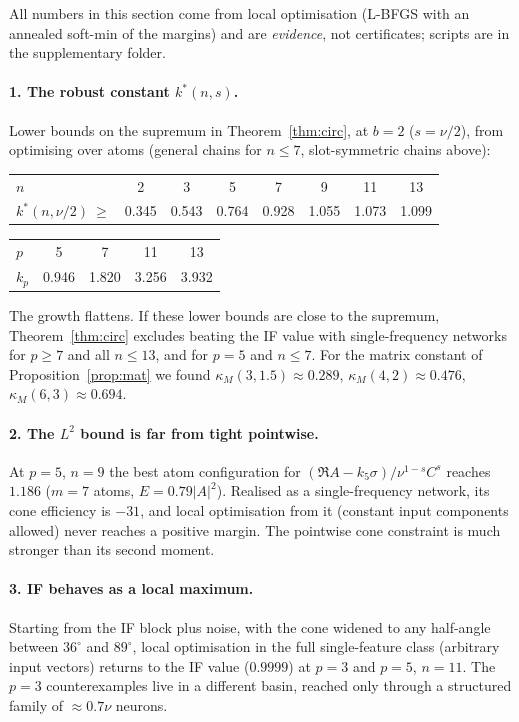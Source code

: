 All numbers in this section come from local optimisation (L-BFGS with an annealed soft-min of the margins) and are
\emph{evidence}, not certificates; scripts are in the supplementary folder.

\paragraph{1. The robust constant $k^*(n,s)$.}  Lower bounds on the supremum in Theorem~\ref{thm:circ}, at $b=2$
($s=\nu/2$), from optimising over atoms (general chains for $n\le7$, slot-symmetric chains above):
\begin{center}
\begin{tabular}{lccccccc}
\toprule
$n$ & 2 & 3 & 5 & 7 & 9 & 11 & 13\\
$k^*(n,\nu/2)\ \ge$ & 0.345 & 0.543 & 0.764 & 0.928 & 1.055 & 1.073 & 1.099\\
\bottomrule
\end{tabular}
\qquad
\begin{tabular}{lcccc}
\toprule
$p$ & 5 & 7 & 11 & 13\\
$k_p$ & 0.946 & 1.820 & 3.256 & 3.932\\
\bottomrule
\end{tabular}
\end{center}
The growth flattens.  If these lower bounds are close to the supremum, Theorem~\ref{thm:circ} excludes beating the IF value
with single-frequency networks for $p\ge7$ and all $n\le13$, and for $p=5$ and $n\le7$.  For the matrix constant of
Proposition~\ref{prop:mat} we found $\kappa_M(3,1.5)\approx0.289$, $\kappa_M(4,2)\approx0.476$, $\kappa_M(6,3)\approx0.694$.

\paragraph{2. The $L^2$ bound is far from tight pointwise.}  At $p=5$, $n=9$ the best atom configuration for
$(\Re A-k_5\sigma)/\nu^{1-s}C^s$ reaches $1.186$ ($m=7$ atoms, $E=0.79|A|^2$).  Realised as a single-frequency network,
its cone efficiency is $-31$, and local optimisation from it (constant input components allowed) never reaches a positive
margin.  The pointwise cone constraint is much stronger than its second moment.

\paragraph{3. IF behaves as a local maximum.}  Starting from the IF block plus noise, with the cone widened to any
half-angle between $36^\circ$ and $89^\circ$, local optimisation in the full single-feature class (arbitrary input
vectors) returns to the IF value ($0.9999$) at $p=3$ and $p=5$, $n=11$.  The $p=3$ counterexamples live in a different
basin, reached only through a structured family of $\approx0.7\nu$ neurons.

